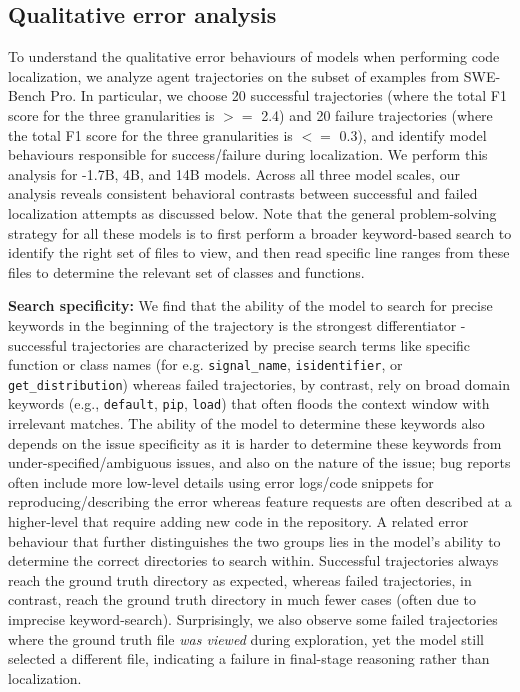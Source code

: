 \subsection{Qualitative error analysis}
To understand the qualitative error behaviours of \methodname models when performing code localization, we analyze agent trajectories on the subset of examples from SWE-Bench Pro. In particular, we choose 20 successful trajectories (where the total F1 score for the three granularities is $>=$ 2.4) and 20 failure trajectories (where the total F1 score for the three granularities is $<=$ 0.3), and identify model behaviours responsible for success/failure during localization. We perform this analysis for \methodname-1.7B, 4B, and 14B models. Across all three model scales, our analysis reveals consistent behavioral contrasts between successful and failed localization attempts as discussed below. Note that the general problem-solving strategy for all these models is to first perform a broader keyword-based search to identify the right set of files to view, and then read specific line ranges from these files to determine the relevant set of classes and functions.

\textbf{Search specificity:} We find that the ability of the model to search for precise keywords in the beginning of the trajectory is the strongest differentiator - successful trajectories are characterized by precise search terms like specific function or class names (for e.g. \texttt{signal\_name}, \texttt{isidentifier}, or \texttt{get\_distribution})  whereas failed trajectories, by contrast, rely on broad domain keywords (e.g., \texttt{default}, \texttt{pip}, \texttt{load}) that often floods the context window with irrelevant matches. The ability of the model to determine these keywords also depends on the issue specificity as it is harder to determine these keywords from under-specified/ambiguous issues, and also on the nature of the issue; bug reports often include more low-level details using error logs/code snippets for reproducing/describing the error whereas feature requests are often described at a higher-level that require adding new code in the repository. A related error behaviour that further distinguishes the two groups lies in the model's ability to determine the correct directories to search within. Successful trajectories always reach the ground truth directory as expected, whereas failed trajectories, in contrast, reach the ground truth directory in much fewer cases (often due to imprecise keyword-search). Surprisingly, we also observe some failed trajectories where the ground truth file \emph{was viewed} during exploration, yet the model still selected a different file, indicating a failure in final-stage reasoning rather than localization.

